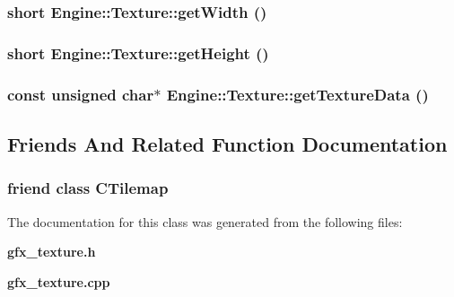 \subsubsection{\setlength{\rightskip}{0pt plus 5cm}short Engine::Texture::getWidth ()\hspace{0.3cm}{\tt  [inline]}}\label{classEngine_1_1Texture_609855f4ecc41421d8ff3358426a8d4c}


\subsubsection{\setlength{\rightskip}{0pt plus 5cm}short Engine::Texture::getHeight ()\hspace{0.3cm}{\tt  [inline]}}\label{classEngine_1_1Texture_357a6cfd16ad49c8a6489f15b3fdb5e0}


\subsubsection{\setlength{\rightskip}{0pt plus 5cm}const unsigned char$\ast$ Engine::Texture::getTextureData ()\hspace{0.3cm}{\tt  [inline]}}\label{classEngine_1_1Texture_6691601bfaab947847e1b6ce35016ee8}




\subsection{Friends And Related Function Documentation}
\subsubsection{\setlength{\rightskip}{0pt plus 5cm}friend class CTilemap\hspace{0.3cm}{\tt  [friend]}}\label{classEngine_1_1Texture_7ea6a24b8e1f9ba1106fa715c2cba4cc}




The documentation for this class was generated from the following files:\begin{CompactItemize}
\item 
{\bf gfx\_\-texture.h}\item 
{\bf gfx\_\-texture.cpp}\end{CompactItemize}
